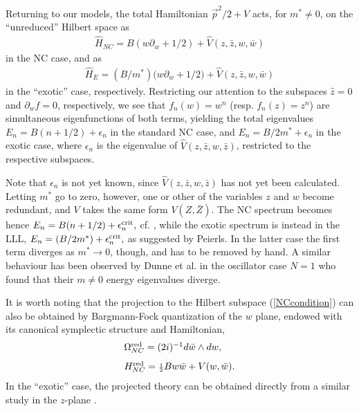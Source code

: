 \documentclass[a4paper,11pt]{article}
\newcommand{\half}{{\scriptstyle{\frac{1}{2}}}}
\newcommand{\red}{{\rm red}}
\def\p{{\partial}}
\def\vp{{\vec p}}
\begin{document}
Returning to our models, the total Hamiltonian
  ${\vp^2}/2+V$ acts, for $m^*\neq0$,
on the ``unreduced'' Hilbert space as
\begin{eqnarray*}
\widehat{H}_{NC}=B(w\p_{w}+1/2)+\widehat{V}(z,\bar{z}, w, \bar{w})
\end{eqnarray*}
in the NC case, and as
\begin{eqnarray*}
\widehat{H}_{E}=(B/m^*)\big(w\p_{w}+1/2\big)+
\widehat{V}(z,\bar{z}, w, \bar{w})
\end{eqnarray*}
in the ``exotic'' case, respectively.
Restricting our attention to the  subspaces $\widehat{z}=0$ and
$\p_{w}f=0$, respectively, we see
that   $f_{n}(w)=w^n$ (resp. $f_{n}(z)=z^n$) are simultaneous
eigenfunctions of both terms, yielding the total eigenvalues
$E_{n}=B(n+1/2)+\epsilon_{n}$ in the standard NC case,
and
$E_{n}=B/2m^*+\epsilon_{n}$ in the exotic case,
where $\epsilon_{n}$ is the eigenvalue of
$\widehat{V}(z,\bar{z},w,\bar{z})$, restricted to the respective
subspaces.

Note that $\epsilon_{n}$ is not yet known, since
$\widehat{V}(z,\bar{z},w,\bar{z})$ has not yet been calculated.
Letting $m^*$ go to zero, however, one or other of the
variables $z$ and $w$ become redundant, and $V$ takes the same form
$V(Z,\bar{Z})$.
The NC spectrum becomes hence
$
E_{n}=B(n+1/2)+\epsilon_{n}^{\rm crit},
$ cf. \cite{BNS}, while
the exotic spectrum is instead in the LLL,
$
E_{n}=(B/2m^*)+\epsilon_{n}^{\rm crit},
$
as suggested by Peierls. In the latter case
the first term diverges as $m^*\to0$, though,
and has to be removed by hand.
A similar behaviour has been observed by Dunne et al. \cite{DJT}
in the oscillator case $N=1$ who found that their $m\neq0$
energy eigenvalues diverge.


It is worth noting that the projection to the Hilbert
subspace (\ref{NCcondition}) can also be obtained by Bargmann-Fock
quantization of the $w$ plane, endowed with its canonical
symplectic structure and Hamiltonian,
\begin{equation}
     \begin{array}{ll}
	\Omega_{NC}^{\red}=(2i)^{-1}d\bar{w}\wedge dw,\hfill
	\\[8pt]
	H_{NC}^{\red}=\half Bw\bar{w}+V(w,\bar{w}).\hfill
	\end{array}
	\label{wNCredsympham}
\end{equation}
In the ``exotic'' case, the projected theory can be obtained
directly from a similar study
in the $z$-plane \cite{DJT, DH}.

\end{document}
